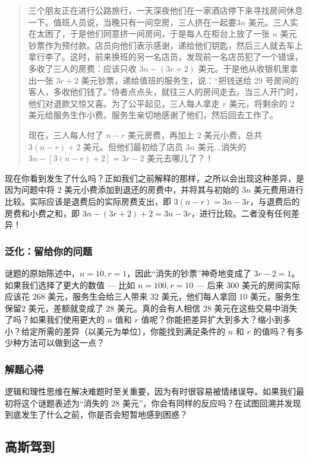 \begin{quote}
    三个朋友正在进行公路旅行，一天深夜他们在一家酒店停下来寻找房间休息一下。值班人员说，当晚只有一间空房，三人挤在一起要$3n$ 美元。三人实在太困了，于是他们同意挤一间房间，于是每人在柜台上放了一张 $n$ 美元钞票作为预付款。店员向他们表示感谢，递给他们钥匙，然后三人就去车上拿行李了。这时，前来换班的另一名店员，发现前一名店员犯了一个错误，多收了三人的房费：应该只收 $3n - (3r + 2)$ 美元。于是他从收银机里拿出一张 $3r + 2$ 美元钞票，递给值班的服务生，说：“把钱送给 29 号房间的客人，多收他们钱了。”侍者点点头，就往三人的房间走去。当三人开门时，他们对退款又惊又喜。为了公平起见，三人每人拿走 $r$ 美元，将剩余的 $2$ 美元给服务生作小费。服务生亲切地感谢了他们，然后回去工作了。

    现在，三人每人付了 $n-r$ 美元房费，再加上 $2$ 美元小费，总共 $3(n-r)+2$ 美元。但他们最初给了店员 $3n$ 美元...消失的 $3n - [3(n - r) + 2]=3r - 2$ 美元去哪儿了？！
\end{quote}

现在你看到发生了什么吗？正如我们之前解释的那样，之所以会出现这种差异，是因为问题中将 $2$ 美元小费添加到退还的房费中，并将其与初始的 $3n$ 美元费用进行比较。实际应该是退费后的实际房费支出，即 $3(n-r) = 3n - 3r$，与退费后的房费和小费之和，即 $3n-(3r+2)+2 = 3n-3r$，进行比较。二者没有任何差异！

\subsubsection*{泛化：留给你的问题}

谜题的原始陈述中，$n=10, r=1$，因此“消失的钞票”神奇地变成了 $3r-2=1$。如果我们选择了更大的数值 --- 比如 $n=100, r=10$ --- 后来 $300$ 美元的房间实际应该花 $268$ 美元，服务生会给三人带来 $32$ 美元，他们每人拿回 $10$ 美元，服务生保留$2$ 美元，差额就变成了 $28$ 美元。真的会有人相信 $28$ 美元在这些交易中消失了吗？如果我们使用更大的 $n$ 值和 $r$ 值呢？你能把差异扩大到多大？缩小到多小？给定所需的差异（以美元为单位），你能找到满足条件的 $n$ 和 $r$ 的值吗？有多少种方法可以做到这一点？

\subsubsection*{解题心得}

逻辑和理性思维在解决难题时至关重要，因为有时很容易被情绪误导。如果我们最初将这个谜题表述为“消失的 $28$ 美元”，你会有同样的反应吗？在试图回溯并发现到底发生了什么之前，你是否会短暂地感到困惑？

\subsection{高斯驾到}\label{sec:section1.4.2}

